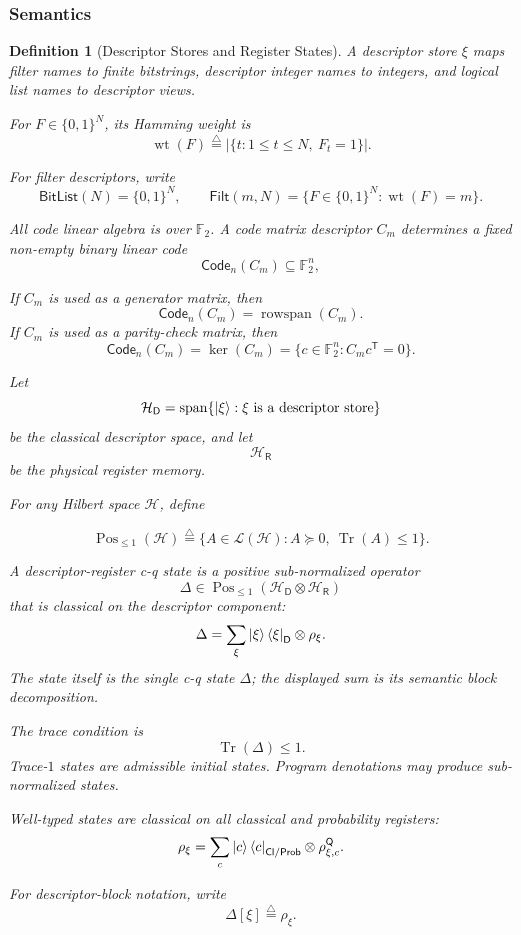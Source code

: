 \documentclass[acmsmall,screen,review,anonymous,nonacm]{acmart}
\newtheorem{definition}{Definition}[section]
\theoremstyle{defn_style}
\begin{document}
\subsubsection{\textbf{Semantics}}

\begin{definition}[Descriptor Stores and Register States]
  A descriptor store \(\xi\) maps filter names to finite bitstrings, descriptor
  integer names to integers, and logical list names to descriptor views.

For \(F\in\{0,1\}^N\), its Hamming weight is
\[
\operatorname{wt}(F)
\stackrel{\triangle}{=}
|\{t:1\le t\le N,\ F_t=1\}|.
\]
  
  
  For filter descriptors, write
  \[
  \mathsf{BitList}(N)
  =
  \{0,1\}^{N},
  \qquad
  \mathsf{Filt}(m,N)
  =
  \{F\in\{0,1\}^{N}:\operatorname{wt}(F)=m\}.
  \]


  All code linear algebra is over \(\mathbb F_2\).  A code matrix descriptor \(C_m\) determines a fixed non-empty binary linear code
\[
\mathsf{Code}_n(C_m)\subseteq \mathbb F_2^n,
\]

If \(C_m\) is used as a generator matrix, then
\[
\mathsf{Code}_n(C_m)=\operatorname{rowspan}(C_m).
\]
If \(C_m\) is used as a parity-check matrix, then
\[
\mathsf{Code}_n(C_m)
=
\ker(C_m)
=
\{c\in\mathbb F_2^n:C_m c^{\mathsf T}=0\}.
\]

  Let
  \[
  \mathcal H_{\mathsf D}
  =
  \operatorname{span}\{\ket{\xi}:\xi\text{ is a descriptor store}\}
  \]
  be the classical descriptor space, and let
  \[
  \mathcal H_{\mathsf R}
  \]
  be the physical register memory.

For any Hilbert space \(\mathcal H\), define

\[
\operatorname{Pos}_{\le1}(\mathcal H)
\stackrel{\triangle}{=}
\{A\in\mathcal L(\mathcal H):A\succeq0,\ \operatorname{Tr}(A)\le1\}.
\]
  
  A descriptor-register c-q state is a positive sub-normalized operator
  \[
  \Delta
  \in
  \operatorname{Pos}_{\le 1}
  \left(
  \mathcal H_{\mathsf D}\otimes\mathcal H_{\mathsf R}
  \right)
  \]
  that is classical on the descriptor component:
  \[
  \Delta
  =
  \sum_{\xi}
  \ket{\xi}\bra{\xi}_{\mathsf D}
  \otimes
  \rho_{\xi}.
  \]
  The state itself is the single c-q state \(\Delta\); the displayed sum is its
  semantic block decomposition.
  
  The trace condition is
  \[
  \operatorname{Tr}(\Delta)\le 1.
  \]
  Trace-\(1\) states are admissible initial states. Program denotations may
  produce sub-normalized states.

  Well-typed states are classical on all classical and probability registers:
\[
\rho_{\xi}
=
\sum_c
\ket c\bra c_{\mathsf{Cl/Prob}}
\otimes
\rho_{\xi,c}^{\mathsf Q}.
\]
  
  For descriptor-block notation, write
  \[
  \Delta[\xi]\stackrel{\triangle}{=}\rho_{\xi}.
  \]
  \end{definition}
\end{document}
